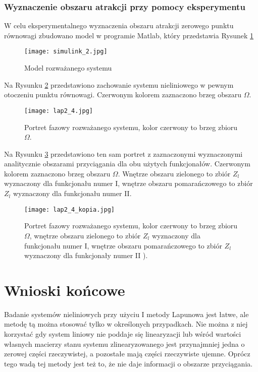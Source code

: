 \documentclass[a4paper,11pt]{article}
\begin{document}
\subsubsection{Wyznaczenie obszaru atrakcji przy pomocy eksperymentu}
W celu eksperymentalnego wyznaczenia obszaru atrakcji zerowego punktu równowagi zbudowano model w programie Matlab, który przedstawia Rysunek \ref{fig:simulink_2}
\begin{figure}[H]
\centerline{\texttt{[image: simulink\_2.jpg]}}
\centering
\caption{Model rozważanego systemu}
\label{fig:simulink_2}
\end{figure}
Na Rysunku \ref{fig:lap2_4} przedstawiono zachowanie systemu nieliniowego w pewnym otoczeniu punktu równowagi. Czerwonym kolorem zaznaczono brzeg obszaru \( \Omega \). 
\begin{figure}[H]
\centerline{\texttt{[image: lap2\_4.jpg]}}
\caption{Portret fazowy rozważanego systemu, kolor czerwony to brzeg zbioru \( \Omega \).}
\label{fig:lap2_4}
\end{figure}
\newpage
Na Rysunku \ref{fig:lap2_4_kopia} przedstawiono ten sam portret z zaznaczonymi wyznaczonymi analitycznie obszarami przyciągania dla obu użytych funkcjonałów. Czerwonym kolorem zaznaczono brzeg obszaru \( \Omega \). Wnętrze obszaru zielonego to zbiór \(Z_{l}\) wyznaczony dla funkcjonału numer I, wnętrze obszaru pomarańczowego to zbiór \(Z_{l}\) wyznaczony dla funkcjonału numer II.
\begin{figure}[H]
\centerline{\texttt{[image: lap2\_4\_kopia.jpg]}}
\caption{Portret fazowy rozważanego systemu, kolor czerwony to brzeg zbioru \( \Omega \), wnętrze obszaru zielonego to zbiór \(Z_{l}\) wyznaczony dla funkcjonału numer I, wnętrze obszaru pomarańczowego to zbiór \(Z_{l}\) wyznaczony dla funkcjonały numer II ).}
\label{fig:lap2_4_kopia}
\end{figure}


\section{Wnioski końcowe}
Badanie systemów nieliniowych przy użyciu I metody Lapunowa jest łatwe, ale metodę tą można stosować tylko w określonych przypadkach. Nie można z niej korzystać gdy system liniowy nie poddaje się linearyzacji lub wśród wartości własnych macierzy stanu systemu zlinearyzowanego jest przynajmniej jedna o zerowej części rzeczywistej, a pozostałe mają części rzeczywiste ujemne. Oprócz tego wadą tej metody jest też to, że nie daje informacji o obszarze przyciągania. 
\end{document}
